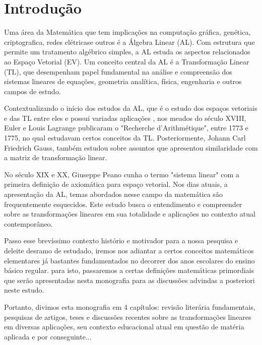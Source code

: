 \chapter{Introdução}
Uma área da Matemática que tem implicações na computação gráfica, genética, criptografica, redes elétricase outros é a Álgebra Linear (AL). Com estrutura que permite um tratamento algébrico simples, a AL estuda os aspectos relacionados ao Espaço Vetorial (EV). Um conceito central da AL é a Transformação Linear (TL), que desempenham papel fundamental na análise e compreensão dos sistemas lineares de equações, geometria analítica, física, engenharia e outros campos de estudo. %

Contextualizando o início dos estudos da AL, que é o estudo dos espaços vetoriais e das TL entre eles e possui variadas aplicações %
, nos meados do século XVIII, Euler e Louis Lagrange publicaram o "Recherche d'Arithmétique", entre 1773 e 1775, no qual estudavam certos conceitos da TL. Posteriormente, Johann Carl Friedrich Gauss, também estudou sobre assuntos que apresentou similaridade com a matriz de transformação linear.

No século XIX e XX, Giuseppe Peano cunha o termo "sistema linear" com a primeira definição de axiomática para espaço vetorial. Nos dias atuais, a apresentação da AL, temas abordados nesse campo da matemática são frequentemente esquecidos. Este estudo busca o entendimento e compreender sobre as transformações lineares em sua totalidade e aplicações no contexto atual contemporâneo.

Passo esse brevíssimo contexto histório e motivador para a nossa pesquisa e deleite desramo de estudado, iremos nos adiantar a certos conceitos matemáticos elementares já bastantes fundamentados no decorrer dos anos escolares do ensino básico regular. para isto, passaremos a certas definições matemáticas primordiais que serão apresentadas nesta monografia para as discussões advindas a posteriori neste estudo.

Portanto, divimos esta monografia em 4 capítulos: revisão literária fundamentais, pesquisas de artigos, teses e discussões recentes sobre as transformações lineares em diversas aplicações, seu contexto educacional atual em questão de matéria aplicada e por conseguinte...
